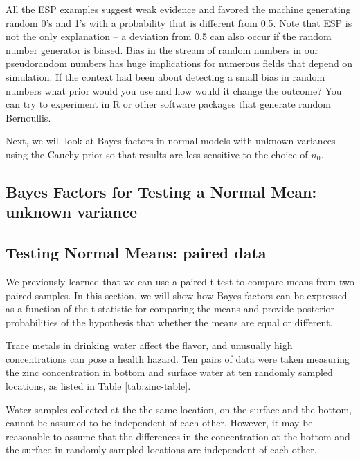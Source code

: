 \documentclass[]{book}
\theoremstyle{definition}
\theoremstyle{definition}
\theoremstyle{definition}
\theoremstyle{remark}
\let\BeginKnitrBlock\begin \let\EndKnitrBlock\end
\begin{document}
All the ESP examples suggest weak evidence and favored the machine
generating random 0's and 1's with a probability that is different from
0.5. Note that ESP is not the only explanation -- a deviation from 0.5
can also occur if the random number generator is biased. Bias in the
stream of random numbers in our pseudorandom numbers has huge
implications for numerous fields that depend on simulation. If the
context had been about detecting a small bias in random numbers what
prior would you use and how would it change the outcome? You can try to
experiment in R or other software packages that generate random
Bernoullis.

Next, we will look at Bayes factors in normal models with unknown
variances using the Cauchy prior so that results are less sensitive to
the choice of \(n_0\).

\subsection{Bayes Factors for Testing a Normal Mean: unknown
variance}\label{bayes-factors-for-testing-a-normal-mean-unknown-variance}

\subsection{Testing Normal Means: paired
data}\label{testing-normal-means-paired-data}

We previously learned that we can use a paired t-test to compare means
from two paired samples. In this section, we will show how Bayes factors
can be expressed as a function of the t-statistic for comparing the
means and provide posterior probabilities of the hypothesis that whether
the means are equal or different.

\BeginKnitrBlock{example}
\protect\hypertarget{exm:zinc}{}{\label{exm:zinc} }Trace metals in drinking
water affect the flavor, and unusually high concentrations can pose a
health hazard. Ten pairs of data were taken measuring the zinc
concentration in bottom and surface water at ten randomly sampled
locations, as listed in Table \ref{tab:zinc-table}.

Water samples collected at the the same location, on the surface and the
bottom, cannot be assumed to be independent of each other. However, it
may be reasonable to assume that the differences in the concentration at
the bottom and the surface in randomly sampled locations are independent
of each other.
\EndKnitrBlock{example}
\end{document}
